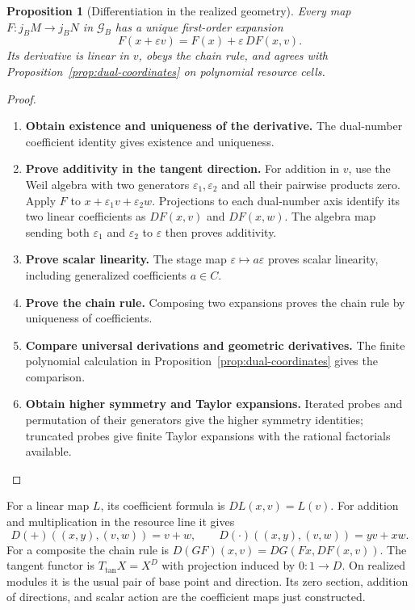 \documentclass[11pt,a4paper]{article}
\numberwithin{algorithm}{section}
\numberwithin{equation}{section}
\newtheorem{proposition}[proposition]{Proposition}
\theoremstyle{definition}
\theoremstyle{remark}
\theoremstyle{plain}
\newcommand{\eps}{\varepsilon}
\newcommand{\Geo}{\mathcal G_B}
\theoremstyle{definition}
\theoremstyle{plain}
\begin{document}
\begin{proposition}[Differentiation in the realized geometry]\label{prop:geometric-d}
Every map $F:j_BM\to j_BN$ in $\Geo$ has a unique first-order expansion
\[
 F(x+\eps v)=F(x)+\eps\,DF(x,v).
\]
Its derivative is linear in $v$, obeys the chain rule, and agrees with Proposition~\ref{prop:dual-coordinates} on polynomial resource cells.
\end{proposition}
\begin{proof}\leavevmode
\begin{enumerate}[leftmargin=*,align=left]
\item \textbf{Obtain existence and uniqueness of the derivative.}
The dual-number coefficient identity gives existence and uniqueness.

\item \textbf{Prove additivity in the tangent direction.}
For addition in $v$, use the Weil algebra with two generators $\eps_1,\eps_2$ and all their pairwise products zero. Apply $F$ to $x+\eps_1v+\eps_2w$. Projections to each dual-number axis identify its two linear coefficients as $DF(x,v)$ and $DF(x,w)$. The algebra map sending both $\eps_1$ and $\eps_2$ to $\eps$ then proves additivity.

\item \textbf{Prove scalar linearity.}
The stage map $\eps\mapsto a\eps$ proves scalar linearity, including generalized coefficients $a\in C$.

\item \textbf{Prove the chain rule.}
Composing two expansions proves the chain rule by uniqueness of coefficients.

\item \textbf{Compare universal derivations and geometric derivatives.}
The finite polynomial calculation in Proposition~\ref{prop:dual-coordinates} gives the comparison.

\item \textbf{Obtain higher symmetry and Taylor expansions.}
Iterated probes and permutation of their generators give the higher symmetry identities; truncated probes give finite Taylor expansions with the rational factorials available.
\end{enumerate}
\end{proof}

For a linear map $L$, its coefficient formula is $DL(x,v)=L(v)$.
For addition and multiplication in the resource line it gives
\[
 D(+)((x,y),(v,w))=v+w,\qquad
 D(\cdot)((x,y),(v,w))=yv+xw.
\]
For a composite the chain rule is
$D(GF)(x,v)=DG(Fx,DF(x,v))$.
The tangent functor is $T_{\mathrm{tan}}X=X^D$ with
projection induced by $0:1\to D$. On realized modules it
is the usual pair of base point and direction. Its zero
section, addition of directions, and scalar action are
the coefficient maps just constructed.
\end{document}
